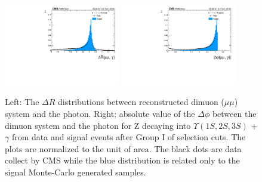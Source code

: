\begin{figure}[!htbp]
\begin{center}
\includegraphics[width=0.45\textwidth]{figures_and_tables/outputPlots/ZtoUpsilon_Cat0_ZZZZZ/au/data_x_mc/noKinCuts/h_noKin_deltaR_Upsilon_Photon}\hspace*{1.cm}
\includegraphics[width=0.45\textwidth]{figures_and_tables/outputPlots/ZtoUpsilon_Cat0_ZZZZZ/au/data_x_mc/noKinCuts/h_noKin_deltaPhi_Upsilon_Photon}\end{center}\vspace*{-.5cm}
\caption{Left: The $\Delta R$ distributions between reconstructed dimuon ($\mu\mu$) system and the photon. Right: absolute value of the $\Delta \phi$ between the dimuon system and the photon for Z decaying into $\Upsilon(1S,2S,3S)$ + $\gamma$ from data and signal events after Group I of selection cuts. The plots are normalized to the unit of area. The black dots are data collect by CMS while the blue distribution is related only to the signal Monte-Carlo generated samples.}
\label{fig:deltaRdeltaPhi_ZtoUpsilon_Cat0}
\end{figure}


